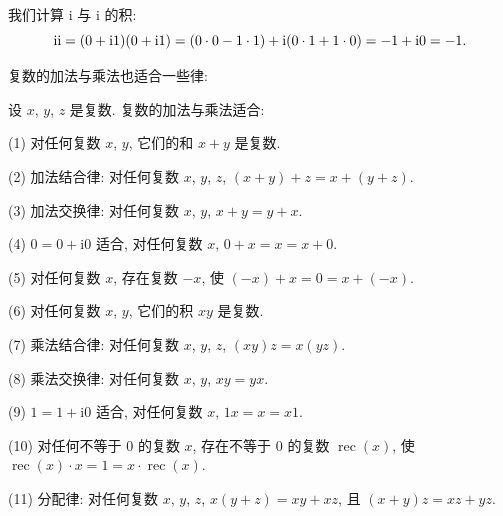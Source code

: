 \documentclass[../libro.tex]{subfiles}
\begin{document}
\begin{example}
    我们计算 \(\mathrm{i}\) 与 \(\mathrm{i}\)
    的积:
    \begin{equation*}
        \mathrm{i} \mathrm{i}
        = (0 + \mathrm{i} 1) (0 + \mathrm{i} 1)
        = (0 \cdot 0 - 1 \cdot 1)
        + \mathrm{i} (0 \cdot 1 + 1 \cdot 0)
        = -1 + \mathrm{i} 0
        = -1.
        \qedhere
    \end{equation*}
\end{example}

复数的加法与乘法也适合一些律:

\begin{theorem}
    设 \(x\), \(y\), \(z\) 是复数.
    复数的加法与乘法适合:

    (1)
    对任何复数 \(x\), \(y\),
    它们的和 \(x + y\) 是复数.

    (2)
    加法结合律:
    对任何复数 \(x\), \(y\), \(z\),
    \((x + y) + z = x + (y + z)\).

    (3)
    加法交换律:
    对任何复数 \(x\), \(y\),
    \(x + y = y + x\).

    (4)
    \(0 = 0 + \mathrm{i} 0\) 适合,
    对任何复数 \(x\),
    \(0 + x = x = x + 0\).

    (5)
    对任何复数 \(x\), 存在复数 \(-x\), 使
    \((-x) + x = 0 = x + (-x)\).

    (6)
    对任何复数 \(x\), \(y\),
    它们的积 \(x y\) 是复数.

    (7)
    乘法结合律:
    对任何复数 \(x\), \(y\), \(z\),
    \((x y) z = x (y z)\).

    (8)
    乘法交换律:
    对任何复数 \(x\), \(y\),
    \(x y = y x\).

    (9)
    \(1 = 1 + \mathrm{i} 0\) 适合,
    对任何复数 \(x\),
    \(1 x = x = x 1\).

    (10)
    对任何不等于 \(0\) 的复数 \(x\),
    存在不等于 \(0\) 的复数 \(\operatorname{rec} {(x)}\), 使
    \(\operatorname{rec} {(x)} \cdot x
        = 1
    = x \cdot \operatorname{rec} {(x)}\).

    (11)
    分配律:
    对任何复数 \(x\), \(y\), \(z\),
    \(x (y + z) = x y + x z\),
    且 \((x + y) z = x z + y z\).
\end{theorem}
\end{document}
